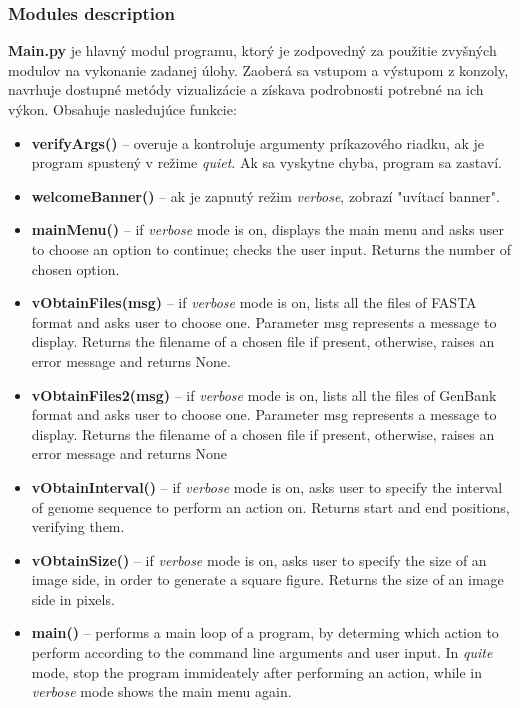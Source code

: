 \subsubsection{Modules description}
\textbf{\selectfont Main.py} je hlavný modul programu, ktorý je zodpovedný za použitie zvyšných modulov na vykonanie zadanej úlohy.
Zaoberá sa vstupom a výstupom z konzoly, navrhuje dostupné metódy vizualizácie a získava podrobnosti potrebné na ich výkon.
Obsahuje nasledujúce funkcie:
\begin{itemize}
  \item \textbf{\selectfont verifyArgs()} -- overuje a kontroluje argumenty príkazového riadku, ak je program spustený v režime \textit{quiet}. Ak sa vyskytne chyba, program sa zastaví.
  \item \textbf{\selectfont welcomeBanner()} -- ak je zapnutý režim \textit{verbose}, zobrazí "uvítací banner".
  \item \textbf{\selectfont mainMenu()} -- if \textit{verbose} mode is on, displays the main menu and asks user to choose an option to continue; checks the user input.  Returns the number of chosen option.
  \item \textbf{\selectfont vObtainFiles(msg)} -- if \textit{verbose} mode is on, lists all the files of {\selectfont FASTA} format and asks user to choose one. Parameter {\selectfont msg} represents a message to display. Returns the filename of a chosen file if present, otherwise, raises an error message and {\selectfont returns None}.
  \item \textbf{\selectfont vObtainFiles2(msg)} -- if \textit{verbose} mode is on, lists all the files of {\selectfont GenBank} format and asks user to choose one. Parameter {\selectfont msg} represents a message to display. Returns the filename of a chosen file if present, otherwise, raises an error message and {\selectfont returns None}
  \item \textbf{\selectfont vObtainInterval()} -- if \textit{verbose} mode is on, asks user to specify the interval of genome sequence to perform an action on. Returns {\selectfont start} and {\selectfont end} positions, verifying them.
  \item \textbf{\selectfont vObtainSize()} -- if \textit{verbose} mode is on, asks user to specify the size of an image side, in order to generate a square figure. Returns the size of an image side in pixels.
  \item \textbf{\selectfont main()} -- performs a main loop of a program, by determing which action to perform according to the command line arguments and user input. In \textit{quite} mode, stop the program immideately after performing an action, while in \textit{verbose} mode shows the main menu again.
\end{itemize}



